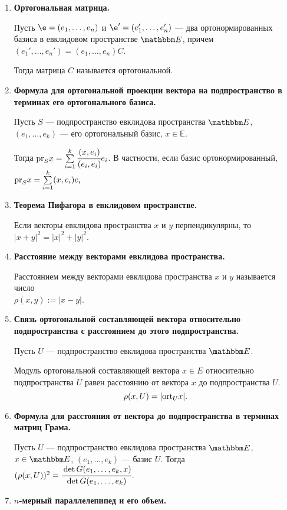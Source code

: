 \begin{enumerate}
\item \textbf{Ортогональная матрица.}

Пусть $\e = (e_1, \ldots, e_n)$ и $\e' = (e_1', \ldots, e_n')$ --- два ортонормированных базиса в евклидовом пространстве $\E$, причем $(e_1', \ldots, e_n') = (e_1, \ldots, e_n)C$. 

Тогда матрица $C$ называется ортогональной.

\item \textbf{Формула для ортогональной проекции вектора на подпространство в терминах его ортогонального базиса.}

Пусть $S$ --- подпространство евклидова пространства $\E$, $(e_1, \ldots, e_k)$ --- его ортогональный базис, $x \in \mathbb{E}$.


Тогда $\mathrm{pr}_S x = \sum\limits_{i = 1}^{k}\cfrac{(x,e_i)}{(e_i, e_i)}e_i$. В частности, если базис ортонормированный, $\mathrm{pr}_S x = \sum\limits_{i = 1}^{k}(x,e_i)e_i$

\item \textbf{Теорема Пифагора в евклидовом пространстве.}

Если векторы евклидова пространства $x$ и $y$ перпендикулярны, то $|x+y|^2 = |x|^2 + |y|^2$.

\item \textbf{Расстояние между векторами евклидова пространства.}

Расстоянием между векторами евклидова пространства $x$ и $y$ называется число \\$\rho(x,y) := |x-y|$.

\item \textbf{Связь ортогональной составляющей вектора относительно подпространства с расстоянием до этого подпространства.}

Пусть $U$ --- подпространство евклидова пространства $\E$.

Модуль ортогональной составляющей вектора $x \in E$ относительно подпространства $U$ равен расстоянию от вектора $x$ до подпространства $U$.
$$
\rho (x,U) = |\mathrm{ort}_U x|.
$$

\item \textbf{Формула для расстояния от вектора до подпространства в терминах матриц Грама.}

Пусть $U$ --- подпространство евклидова пространства $\E$, $x \in \E$, $(e_1, \ldots, e_k)$ --- базис $U$. Тогда 
$(\rho(x,U))^2 = \cfrac{\det G(e_1, \ldots, e_k, x)}{\det G(e_1, \ldots, e_k)}$.

\item \textbf{$n$-мерный параллелепипед и его объем.}


\end{enumerate}
